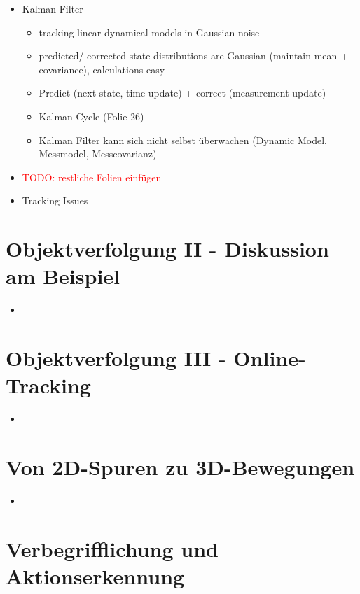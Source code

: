 \documentclass{report}
\newcommand{\todo}[2][red]{\textcolor{#1}{TODO: #2}}
\begin{document}
\begin{itemize}
		\item Kalman Filter
		\begin{itemize}
			\item tracking linear dynamical models in Gaussian noise
			\item predicted/ corrected state distributions are Gaussian (maintain mean + covariance), calculations easy
			\item Predict (next state, time update) + correct (measurement update)
			\item Kalman Cycle (Folie 26)
			\item Kalman Filter kann sich nicht selbst überwachen (Dynamic Model, Messmodel, Messcovarianz)
		\end{itemize}
		
		\item \todo{restliche Folien einfügen}
		\item Tracking Issues
	\end{itemize}
	\newpage
	
	\section{Objektverfolgung II - Diskussion am Beispiel}
	
	\begin{itemize}
		\item 
	\end{itemize}
	
	
	\section{Objektverfolgung III - Online-Tracking}
	
	\begin{itemize}
		\item 
	\end{itemize}
	
	
	\section{Von 2D-Spuren zu 3D-Bewegungen}
	
	\begin{itemize}
		\item 
	\end{itemize}
	
	
	\section{Verbegrifflichung und Aktionserkennung}
	
\end{document}
